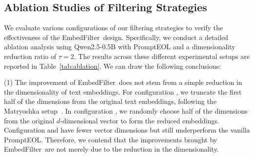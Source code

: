 \documentclass{llmxive}
\providecommand{\name}{EmbedFilter}
\providecommand{\circledNum}[1]{  \tikz[baseline, anchor=base]{\node[draw,circle,inner sep=0.1pt, font=\fontsize{7.5}{10}\selectfont] {#1};}}
\begin{document}
\begin{table}[t]
    \centering
    \vskip -0.05in
    \label{tab:whitening}
\caption{MTEB results for \name~and whitening. Best results are highlighted in bold. }
\end{table}

\subsection{Ablation Studies of Filtering Strategies}
We evaluate various configurations of our filtering strategies to verify the effectiveness of the \name\ design.
Specifically, we conduct a detailed ablation analysis using Qwen2.5-0.5B with PromptEOL and a dimensionality reduction ratio of \(\tau=2\).
The results across these different experimental setups are reported in Table~\ref{tab:ablation}.
We can draw the following conclusions:

(1) The improvement of \name~does not stem from a simple reduction in the dimensionality of text embeddings.
For configuration \circledNum{1}, we truncate the first half of the dimensions from the original text embeddings, following the Matryoshka setup~\cite{kusupati2022matryoshka}.
In configuration \circledNum{2}, we randomly choose half of the dimensions from the original \(d\)-dimensional vector to form the reduced embeddings.
Configuration \circledNum{1} and \circledNum{2} have fewer vector dimensions but still underperform the vanilla PromptEOL.
Therefore, we contend that the improvements brought by \name\ are not merely due to the reduction in the dimensionality.
\end{document}
